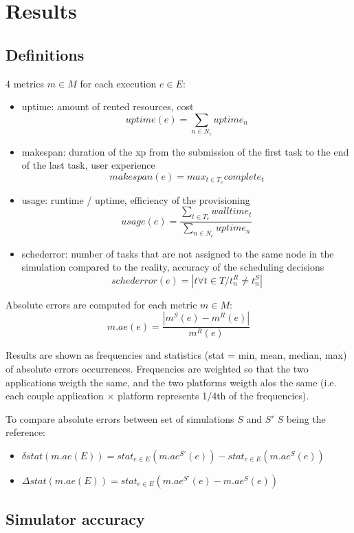 \documentclass[parallelisme]{compas2017}
\begin{document}
\section{Results}

\subsection{Definitions}
4 metrics $m \in M$ for each execution $e \in E$:
\begin{itemize}
 \item uptime: amount of rented resources, cost 
  $$uptime(e) = \sum_{n \in N_e} uptime_n$$
 \item makespan: duration of the xp from the submission of the first task to 
the end of the last task, user experience 
  $$makespan(e) = max_{t \in T_e} complete_t$$
 \item usage: runtime / uptime, efficiency of the provisioning 
  $$usage(e) = \frac{\sum_{t \in T_e} walltime_t}{\sum_{n \in N_e} uptime_n}$$
 \item schederror: number of tasks that are not assigned to the same node in 
the simulation compared to the reality, accuracy of the scheduling decisions
  $$schederror(e) = |t \forall t \in T / t_n^R \neq t_n^S|$$

\end{itemize}

Absolute errors are computed for each metric $m \in M$: 
$$m.ae(e) = \frac{| m^S(e) - m^R(e) |}{m^R(e)}$$

Results are shown as frequencies and statistics (stat = min, mean, median, max) 
of absolute errors occurrences. Frequencies are weighted so that the two applications
weigth the same, and the two platforms weigth alos the same 
(i.e. each couple application $\times$ platform represents 1/4th of the frequencies).

To compare absolute errors between set of simulations $S$ and $S'$
$S$ being the reference:
\begin{itemize}
 \item $\delta stat(m.ae(E)) = stat_{e \in E} ( m.ae^{S'}(e) ) - stat_{e \in E}( m.ae^S(e) )$
 \item $\Delta stat(m.ae(E)) = stat_{e \in E} ( m.ae^{S'}(e) - m.ae^S(e) )$
\end{itemize}




\subsection{Simulator accuracy}
\end{document}
